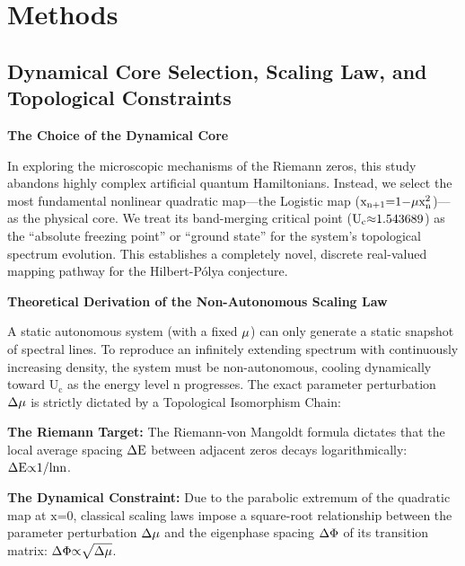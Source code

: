 \documentclass[fleqn,10pt]{wlscirep}
\begin{document}
\section*{Methods}

\subsection*{Dynamical Core Selection, Scaling Law, and Topological Constraints}

\textbf{The Choice of the Dynamical Core}

In exploring the microscopic mechanisms of the Riemann zeros, this study
abandons highly complex artificial quantum Hamiltonians. Instead, we
select the most fundamental nonlinear quadratic map---the Logistic map
(\(\text{x}_{\text{n}\text{+1}}\text{=1\ensuremath{-}}\text{\ensuremath{\mu}}\text{x}_{\text{n}}^{\text{2}}\))---as
the physical core. We treat its band-merging critical point
(\(\text{U}_{\text{c}}\text{\ensuremath{\approx}1.543689}\)) as the ``absolute freezing
point'' or ``ground state'' for the system's topological spectrum
evolution. This establishes a completely novel, discrete real-valued
mapping pathway for the Hilbert-P\'olya conjecture.

\textbf{Theoretical Derivation of the Non-Autonomous Scaling Law}

A static autonomous system (with a fixed \(\text{\ensuremath{\mu}}\)) can only generate
a static snapshot of spectral lines. To reproduce an infinitely
extending spectrum with continuously increasing density, the system must
be non-autonomous, cooling dynamically toward \(\text{U}_{\text{c}}\) as
the energy level \(\text{n}\) progresses. The exact parameter
perturbation \(\text{\ensuremath{\Delta}}\text{\ensuremath{\mu}}\) is strictly dictated by a Topological
Isomorphism Chain:

\textbf{The Riemann Target:} The Riemann-von Mangoldt formula dictates
that the local average spacing \(\text{\ensuremath{\Delta}}\text{E}\) between adjacent
zeros decays logarithmically: \(\text{\ensuremath{\Delta}}\text{E}\text{\ensuremath{\propto}1/ln}\text{n}\).

\textbf{The Dynamical Constraint:} Due to the parabolic extremum of the
quadratic map at \(\text{x}\text{=0}\), classical scaling laws impose a
square-root relationship between the parameter perturbation
\(\text{\ensuremath{\Delta}}\text{\ensuremath{\mu}}\) and the eigenphase spacing \(\text{\ensuremath{\Delta}\ensuremath{\Phi}}\) of its
transition matrix: \(\text{\ensuremath{\Delta}\ensuremath{\Phi}\ensuremath{\propto}}\sqrt{\text{\ensuremath{\Delta}}\text{\ensuremath{\mu}}}\).
\end{document}
